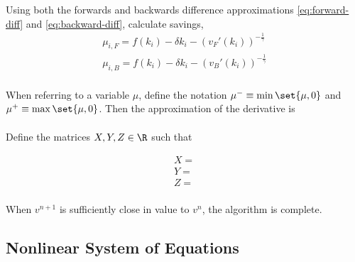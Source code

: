 \documentclass[11pt]{etk-article}
\begin{document}
Using both the forwards and backwards difference approximations \cref{eq:forward-diff} and \cref{eq:backward-diff}, calculate savings,
\begin{align}
\mu_{i,F} = f(k_i) - \delta k_i - \left(v_F'(k_i) \right)^{-\frac{1}{\gamma}}\\
\mu_{i,B} = f(k_i) - \delta k_i - \left(v_B'(k_i) \right)^{-\frac{1}{\gamma}}\\
\end{align}

When referring to a variable $\mu$, define the notation $\mu^{-} \equiv \min\set{\mu,0}$ and $\mu^{+} \equiv \max\set{\mu,0}$. Then the approximation of the derivative is 
\begin{align}
\end{align}


Define the matrices $X, Y, Z \in \R $ such that 

\begin{align}
	X = \\
	Y = \\
	Z = \\
\end{align}

When $v^{n+1}$ is sufficiently close in value to $v^n$, the algorithm is complete. 



\subsection{Nonlinear System of Equations}


\end{document}
